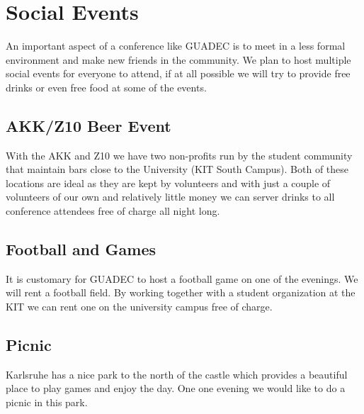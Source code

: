 \newpage

\section{Social Events}

An important aspect of a conference like GUADEC is to meet in a less formal
environment and make new friends in the community. We plan to host multiple
social events for everyone to attend, if at all possible we will try to
provide free drinks or even free food at some of the events.

\begin{multicols}{2}
\raggedcolumns

\subsection{AKK/Z10 Beer Event}

With the AKK and Z10 we have two non-profits run by the student community that
maintain bars close to the University (KIT South Campus).
Both of these locations are ideal as they are kept by volunteers and with just
a couple of volunteers of our own and relatively little money we can
server drinks to all conference attendees free of charge all night long.

\subsection{Football and Games}

It is customary for GUADEC to host a football game on one of the evenings. We will
rent a football field. By working together with a student organization at the
KIT we can rent one on the university campus free of charge.

\subsection{Picnic}

Karlsruhe has a nice park to the north of the castle which provides a beautiful
place to play games and enjoy the day. One one evening we would like to do
a picnic in this park.

\columnbreak


\end{multicols}
